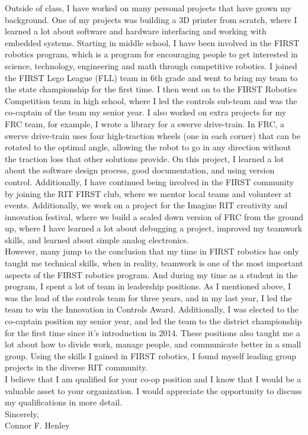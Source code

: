 \documentclass[line,margin]{res}
\begin{document}
\begin{resume}
\begin{adjustwidth}{-92pt}{0pt}
\noindent
Outside of class, I have worked on many personal projects that have grown my background. One of my projects was building a 3D printer from scratch, where I learned a lot about software and hardware interfacing and working with embedded systems. Starting in middle school, I have been involved in the FIRST robotics program, which is a program for encouraging people to get interested in science, technology, engineering and math through competitive robotics. I joined the FIRST Lego League (FLL) team in 6th grade and went to bring my team to the state championship for the first time. I then went on to the FIRST Robotics Competition team in high school, where I led the controls sub-team and was the co-captain of the team my senior year. I also worked on extra projects for my FRC team, for example, I wrote a library for a swerve drive-train. In FRC, a swerve drive-train uses four high-traction wheels (one in each corner) that can be rotated to the optimal angle, allowing the robot to go in any direction without the traction loss that other solutions provide. On this project, I learned a lot about the software design process, good documentation, and using version control. Additionally, I have continued being involved in the FIRST community by joining the RIT FIRST club, where we mentor local teams and volunteer at events. Additionally, we work on a project for the Imagine RIT creativity and innovation festival, where we build a scaled down version of FRC from the ground up, where I have learned a lot about debugging a project, improved my teamwork skills, and learned about simple analog electronics. \\

\noindent
However, many jump to the conclusion that my time in FIRST robotics has only taught me technical skills, when in reality, teamwork is one of the most important aspects of the FIRST robotics program. And during my time as a student in the program, I spent a lot of team in leadership positions. As I mentioned above, I was the lead of the controls team for three years, and in my last year, I led the team to win the Innovation in Controls Award. Additionally, I was elected to the co-captain position my senior year, and led the team to the district championship for the first time since it's introduction in 2014. These positions also taught me a lot about how to divide work, manage people, and communicate better in a small group. Using the skills I gained in FIRST robotics, I found myself leading group projects in the diverse RIT community. \\

\noindent
I believe that I am qualified for your co-op position and I know that I would be a valuable asset to your organization. I would appreciate the opportunity to discuss my qualifications in more detail. \\

Sincerely, \\
Connor F. Henley

\end{adjustwidth}
\end{resume}
\end{document}
